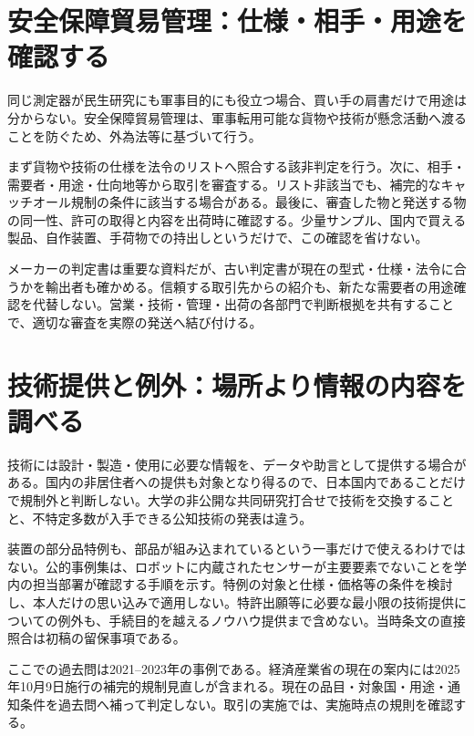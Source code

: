 \section{安全保障貿易管理：仕様・相手・用途を確認する}
\label{theory:export:screening}
同じ測定器が民生研究にも軍事目的にも役立つ場合、買い手の肩書だけで用途は分からない。安全保障貿易管理は、軍事転用可能な貨物や技術が懸念活動へ渡ることを防ぐため、外為法等に基づいて行う\parencite{export_overview}。

まず貨物や技術の仕様を法令のリストへ照合する該非判定を行う。次に、相手・需要者・用途・仕向地等から取引を審査する。リスト非該当でも、補完的なキャッチオール規制の条件に該当する場合がある。最後に、審査した物と発送する物の同一性、許可の取得と内容を出荷時に確認する。少量サンプル、国内で買える製品、自作装置、手荷物での持出しというだけで、この確認を省けない。

メーカーの判定書は重要な資料だが、古い判定書が現在の型式・仕様・法令に合うかを輸出者も確かめる。信頼する取引先からの紹介も、新たな需要者の用途確認を代替しない。営業・技術・管理・出荷の各部門で判断根拠を共有することで、適切な審査を実際の発送へ結び付ける。

\section{技術提供と例外：場所より情報の内容を調べる}
\label{theory:export:exceptions}
技術には設計・製造・使用に必要な情報を、データや助言として提供する場合がある。国内の非居住者への提供も対象となり得るので、日本国内であることだけで規制外と判断しない\parencite{export_scope2022}。大学の非公開な共同研究打合せで技術を交換することと、不特定多数が入手できる公知技術の発表は違う。

装置の部分品特例も、部品が組み込まれているという一事だけで使えるわけではない。公的事例集は、ロボットに内蔵されたセンサーが主要要素でないことを学内の担当部署が確認する手順を示す\parencite{export_cases}。特例の対象と仕様・価格等の条件を検討し、本人だけの思い込みで適用しない。特許出願等に必要な最小限の技術提供についての例外も、手続目的を越えるノウハウ提供まで含めない。当時条文の直接照合は初稿の留保事項である。

\begin{tcolorbox}[title=出題時点と現在の規則]
ここでの過去問は2021--2023年の事例である。経済産業省の現在の案内には2025年10月9日施行の補完的規制見直しが含まれる\parencite{export_current_updates}。現在の品目・対象国・用途・通知条件を過去問へ補って判定しない。取引の実施では、実施時点の規則を確認する。
\end{tcolorbox}
